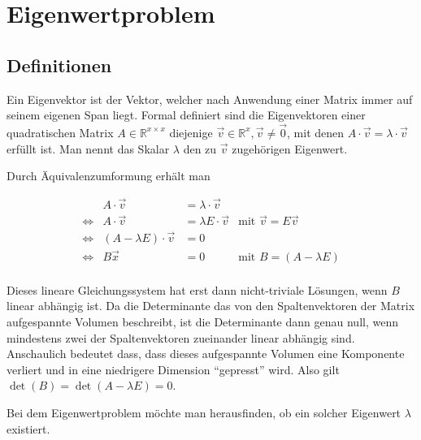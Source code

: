 \documentclass[]{dsadokumentation}
\begin{document}


\section{Eigenwertproblem}

\subsection{Definitionen}\label{k4.2.eigen.def}

Ein Eigenvektor ist der Vektor, welcher nach Anwendung einer Matrix immer auf seinem eigenen Span liegt. Formal definiert sind die Eigenvektoren einer quadratischen Matrix $A \in \mathbb{R}^{x \times x}$ diejenige $\vec{v} \in \mathbb{R}^{x}, \vec{v} \neq \vec{0}$, mit denen $A \cdot \vec{v} = \lambda \cdot \vec{v}$ erfüllt ist. Man nennt das Skalar $\lambda$ den zu $\vec{v}$ zugehörigen Eigenwert. 

Durch Äquivalenzumformung erhält man

\begin{displaymath}
  \begin{aligned}
    && A \cdot \vec{v} &= \lambda \cdot \vec{v} && \\
    &\Leftrightarrow& A \cdot \vec{v} &= \lambda E \cdot \vec{v} &\text{mit } \vec{v} = E\vec{v}& \\
    &\Leftrightarrow& (A - \lambda E) \cdot \vec{v} &= 0 && \\
    &\Leftrightarrow& B\vec{x} &= 0  \quad \quad &\text{mit } B = (A - \lambda E)&  \\ 
  \end{aligned}
\end{displaymath}

Dieses lineare Gleichungssystem hat erst dann nicht-triviale Lösungen, wenn $B$ linear abhängig ist. Da die Determinante das von den Spaltenvektoren der Matrix aufgespannte Volumen beschreibt, ist die Determinante dann genau null, wenn mindestens zwei der Spaltenvektoren zueinander linear abhängig sind. Anschaulich bedeutet dass, dass dieses aufgespannte Volumen eine Komponente verliert und in eine niedrigere Dimension \enquote{gepresst} wird. Also gilt $\det (B) = \det (A - \lambda E) = 0$. 

Bei dem Eigenwertproblem möchte man herausfinden, ob ein solcher Eigenwert $\lambda$ existiert. 
\end{document}

